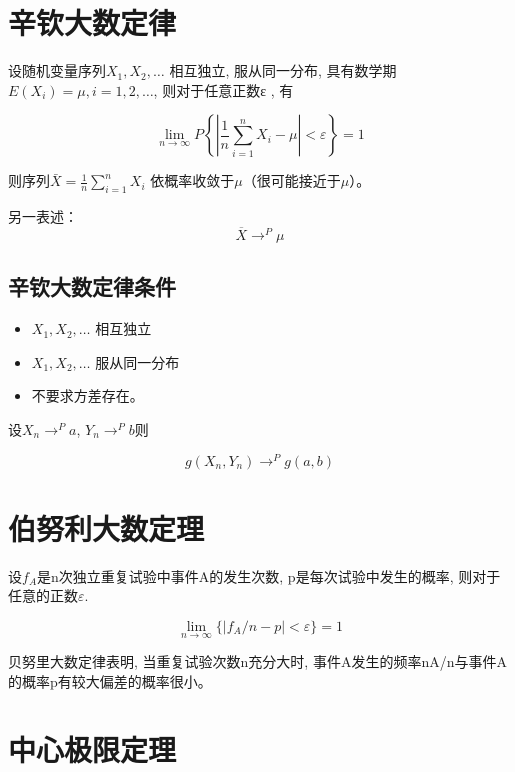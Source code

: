 \section{辛钦大数定律}

\begin{theorem}[辛钦大数定律]
    设随机变量序列$X_1,X_2, …$   相互独立, 服从同一分布, 具有数学期$E(X_i)=\mu, i=1,2,…$,  则对于任意正数ε , 有

$$\lim _{n \rightarrow \infty} P\left\{\left|\frac{1}{n} \sum_{i=1}^{n} X_{i}-\mu\right|<\varepsilon\right\}=1$$

则序列$\bar{X}=\frac{1}{n} \sum_{i=1}^{n} X_{i}$ 依概率收敛于$\mu$（很可能接近于$\mu$）。
\end{theorem}

另一表述：
$$\overline{X} \rightarrow^{P} \mu$$

\subsection{辛钦大数定律条件}

\begin{itemize}
    \item $X_1,X_2, …$ 相互独立
    \item $X_1,X_2, …$ 服从同一分布
    \item 不要求方差存在。 
\end{itemize}

\begin{corollary}
设${X_n \rightarrow^{P} a}$, ${Y_n \rightarrow^{P} b}$则

$$
   g(X_n, Y_n) \rightarrow^{P} g(a,b)
$$
\end{corollary}

\section{伯努利大数定理}

\begin{theorem}[伯努利大数定理]
设$f_A$是n次独立重复试验中事件A的发生次数, p是每次试验中发生的概率, 则对于任意的正数$\varepsilon$.

$$
 \lim_{n \to \infty}\{ |f_A/n - p| < \varepsilon\} = 1  
$$
\end{theorem}

贝努里大数定律表明, 当重复试验次数n充分大时, 事件A发生的频率nA/n与事件A的概率p有较大偏差的概率很小。

\section{中心极限定理}

